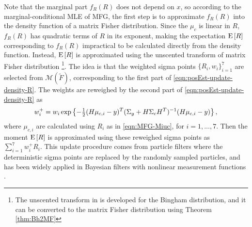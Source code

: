 Note that the marginal part $f_R(R)$ does not depend on $x$, so according to the marginal-conditional MLE of MFG, the first step is to approximate $f_R(R)$ into the density function of a matrix Fisher distribution.
Since the $\mu_c$ is linear in $R$, $f_R(R)$ has quadratic terms of $R$ in its exponent, making the expectation $\mathrm{E}\left[ R \right]$ corresponding to $f_R(R)$ impractical to be calculated directly from the density function.
Instead, $\mathrm{E}\left[ R \right]$ is approximated using the unscented transform of matrix Fisher distribution \cite{gilitschenski2015unscented,lee2018bayesian} \footnote{The unscented transform in \cite{gilitschenski2015unscented} is developed for the Bingham distribution, and it can be converted to the matrix Fisher distribution using Theorem \ref{thm:Bh2MF}}.
The idea is that the weighted sigma points $\{R_i,w_i\}_{i=1}^7$ are selected from $\mathcal{M}(\tilde{F})$, corresponding to the first part of \eqref{eqn:posEst-update-density-R}.
The weights are reweighed by the second part of \eqref{eqn:posEst-update-density-R} as
\begin{align*}
	w_i^+ = w_i \exp\left\{ -\tfrac{1}{2}(H\mu_{c,i}-y)^T (\Sigma_y+H\Sigma_cH^T)^{-1} (H\mu_{c,i}-y) \right\},
\end{align*}
where $\mu_{c,i}$ are calculated using $R_i$ as in \eqref{eqn:MFG-Miuc}, for $i=1,\dots,7$.
Then the moment $\mathrm{E}\left[ R \right]$ is approximated using these reweighed sigma points as $\sum_{i=1}^7 w_i^+R_i$.
This update procedure comes from particle filters \cite{arulampalam2002tutorial} where the deterministic sigma points are replaced by the randomly sampled particles, and has been widely applied in Bayesian filters with nonlinear measurement functions \cite{kurz2016recursive}.

